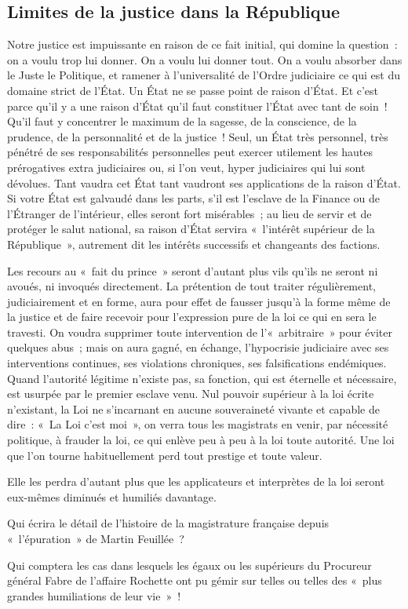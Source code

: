 \documentclass[french,twoside]{book} %
\begin{document}
\subsection[Limites de la justice dans la République]{Limites de la justice dans la République}
\noindent Notre justice est impuissante en raison de ce fait initial, qui domine la question : on a voulu trop lui donner. On a voulu lui donner tout. On a voulu absorber dans le Juste le Politique, et ramener à l’universalité de l’Ordre judiciaire ce qui est du domaine strict de l’État. Un État ne se passe point de raison d’État. Et c’est parce qu’il y a une raison d’État qu’il faut constituer l’État avec tant de soin ! Qu’il faut y concentrer le maximum de la sagesse, de la conscience, de la prudence, de la personnalité et de la justice ! Seul, un État très personnel, très pénétré de ses responsabilités personnelles peut exercer utilement les hautes prérogatives extra judiciaires ou, si l’on veut, hyper judiciaires qui lui sont dévolues. Tant vaudra cet État tant vaudront ses applications de la raison d’État. Si votre État est galvaudé dans les parts, s’il est l’esclave de la Finance ou de l’Étranger de l’intérieur, elles seront fort misérables ; au lieu de servir et de protéger le salut national, sa raison d’État servira « l’intérêt supérieur de la République », autrement dit les intérêts successifs et changeants des factions.\par
Les recours au « fait du prince » seront d’autant plus vils qu’ils ne seront ni avoués, ni invoqués directement. La prétention de tout traiter régulièrement, judiciairement et en forme, aura pour effet de fausser jusqu’à la forme même de la justice et de faire recevoir pour l’expression pure de la loi ce qui en sera le travesti. On voudra supprimer toute intervention de l’« arbitraire » pour éviter quelques abus ; mais on aura gagné, en échange, l’hypocrisie judiciaire avec ses interventions continues, ses violations chroniques, ses falsifications endémiques. Quand l’autorité légitime n’existe pas, sa fonction, qui est éternelle et nécessaire, est usurpée par le premier esclave venu. Nul pouvoir supérieur à la loi écrite n’existant, la Loi ne s’incarnant en aucune souveraineté vivante et capable de dire : « La Loi c’est moi », on verra tous les magistrats en venir, par nécessité politique, à frauder la loi, ce qui enlève peu à peu à la loi toute autorité. Une loi que l’on tourne habituellement perd tout prestige et toute valeur.\par
Elle les perdra d’autant plus que les applicateurs et interprètes de la loi seront eux-mêmes diminués et humiliés davantage.\par
Qui écrira le détail de l’histoire de la magistrature française depuis « l’épuration » de Martin Feuillée ?\par
Qui comptera les cas dans lesquels les égaux ou les supérieurs du Procureur général Fabre de l’affaire Rochette ont pu gémir sur telles ou telles des « plus grandes humiliations de leur vie » !
\end{document}
